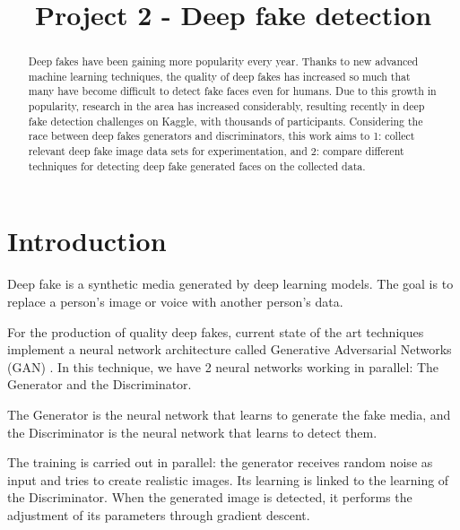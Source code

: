 \documentclass{bmvc2k}
\title{Project 2 - Deep fake detection}
\begin{document}
\maketitle

\begin{abstract}
Deep fakes have been gaining more popularity every year. Thanks to new advanced machine learning techniques, the quality of deep fakes has increased so much that many have become difficult to detect fake faces even for humans. Due to this growth in popularity, research in the area has increased considerably, resulting recently in deep fake detection challenges on Kaggle, with thousands of participants. Considering the race between deep fakes generators and discriminators, this work aims to 1: collect relevant deep fake image data sets for experimentation, and 2: compare different techniques for detecting deep fake generated faces on the collected data.

\end{abstract}

\section{Introduction}
\label{sec:intro}

Deep fake is a synthetic media generated by deep learning models. The goal is to replace a person's image or voice with another person's data.

For the production of quality deep fakes, current state of the art techniques implement a neural network architecture called Generative Adversarial Networks (GAN) \cite{goodfellow_generative_2014}. In this technique, we have 2 neural networks working in parallel: The Generator and the Discriminator.

The Generator is the neural network that learns to generate the fake media, and the Discriminator is the neural network that learns to detect them.

The training is carried out in parallel: the generator receives random noise as input and tries to create realistic images. Its learning is linked to the learning of the Discriminator. When the generated image is detected, it performs the adjustment of its parameters through gradient descent. 
\end{document}
